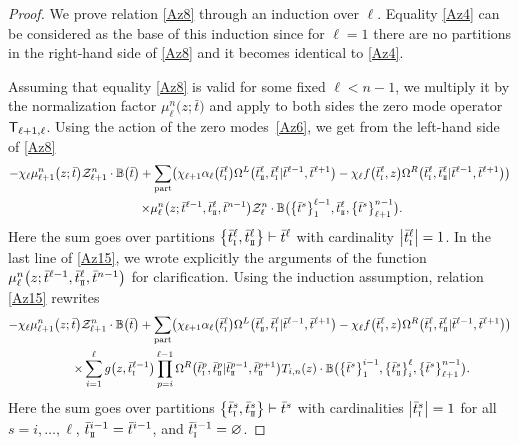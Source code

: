\documentclass[10pt,a4paper]{amsart}
\newcommand{\so}{\scriptscriptstyle \rm I}
\newcommand{\st}{\scriptscriptstyle \rm I\hspace{-1pt}I}
\newcommand{\bt}{{\bar t}}
\theoremstyle{definition}
\def\BB{{\mathbb{B}}}
\def\r#1{\eqref{#1}}
\def\sT{{\sf T}}
\def\vk{\chi}
\def\Z{\mathcal{Z}}
\def\Oml{\Omega^L}
\def\Omr{\Omega^R}
\begin{document}
\begin{proof}
 We prove relation \r{Az8} through an induction over $\ell$.
Equality
\r{Az4} can be considered as the base of this induction since for $\ell=1$
there are no partitions in the right-hand side of \r{Az8} and it becomes identical to
\r{Az4}.

Assuming that equality \r{Az8} is valid for
some fixed $\ell< n-1$, we multiply it by the
normalization factor $\mu^n_\ell\bigl(z;\bt\bigr)$ and apply to both sides the
zero mode operator $\sT_{\ell+1,\ell}$.
Using the action of the zero modes~\r{Az6}, we get from the left-hand side of \r{Az8}
\begin{gather}
-\vk_{\ell} \mu^n_{\ell+1}\bigl(z;\bt\bigr) \Z_{\ell+1}^n\cdot \BB\bigl(\bt\bigr) +\sum_{\rm part}\bigl(\vk_{\ell+1} \alpha_{\ell}\bigl(\bt^\ell_{\so}\bigr)
\Oml\bigl(\bt^\ell_{\st},\bt^\ell_{\so}|\bt^{\ell-1},\bt^{\ell+1}\bigr)-
\vk_\ell f\bigl(\bt^\ell_{\so},z\bigr)
\Omr\bigl(\bt^\ell_{\so},\bt^\ell_{\st}|\bt^{\ell-1},\bt^{\ell+1}\bigr)\bigr)\nonumber\\
\qquad \times \mu^n_\ell\bigl(z;\bt^{\ell-1},\bt^\ell_{\st},\bt^{n-1}\bigr)
\Z_{\ell}^n\cdot \BB\bigl(\bigl\{\bt^s\bigr\}_1^{\ell-1},\bt^\ell_{\st},\bigl\{\bt^s\bigr\}_{\ell+1}^{n-1}\bigr) .\label{Az15}
\end{gather}
Here the sum goes over partitions $\bigl\{\bt^\ell_{\so},\bt^\ell_{\st}\bigr\}\vdash
\bt^\ell$ with cardinality $\big|\bt^\ell_{\so}\big|=1$. In the last line of \eqref{Az15}, we wrote explicitly the arguments
of the function $\mu^n_\ell\bigl(z;\bt^{\ell-1},\bt^\ell_{\st},\bt^{n-1}\bigr)$ for clarification.
Using the induction assumption, relation \r{Az15} rewrites
\begin{gather}
-\vk_{\ell} \mu^n_{\ell+1}\bigl(z;\bt\bigr) \Z_{\ell+1}^n\cdot \BB\bigl(\bt\bigr) +\sum_{\rm part}
\bigl(\vk_{\ell+1} \alpha_{\ell}\bigl(\bt^\ell_{\so}\bigr)
\Oml\bigl(\bt^\ell_{\st},\bt^\ell_{\so}|\bt^{\ell-1},\bt^{\ell+1}\bigr)-
\vk_\ell f\bigl(\bt^\ell_{\so},z\bigr)
\Omr\bigl(\bt^\ell_{\so},\bt^\ell_{\st}|\bt^{\ell-1},\bt^{\ell+1}\bigr)\bigr)\nonumber\\
\qquad \times
\sum_{i=1}^\ell g\bigl(z,\bt^{\ell-1}_{\so}\bigr)
\prod_{p=i}^{\ell-1}\Omr\bigl(\bt^p_{\so},\bt^p_{\st}|\bt^{p-1}_{\st},\bt^{p+1}_{\st}\bigr)
 T_{i,n}(z)\cdot\BB\bigl(\bigl\{\bt^s\bigr\}_1^{i-1},\bigl\{\bt^s_{\st}\bigr\}_i^{\ell},
\bigl\{\bt^s\bigr\}_{\ell+1}^{n-1}\bigr) .\label{Az15a}
\end{gather}
Here the sum goes over partitions $\bigl\{\bt^s_{\so},\bt^s_{\st}\bigr\}\vdash\bt^s$
with cardinalities $\big|\bt^s_{\so}\big|=1$ for all $s=i,\dots,\ell$, $\bt^{i-1}_{\st} = \bt^{i-1}$, and $\bt^{i-1}_{\so} = \varnothing$.


\end{proof}
\end{document}
